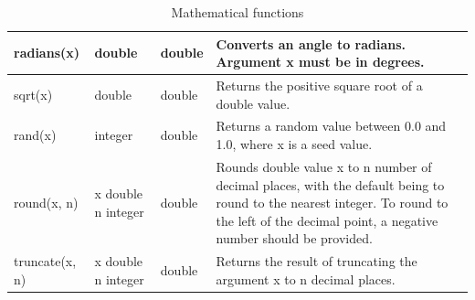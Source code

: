 \documentclass[11pt,a4paper]{ivoa}
\begin{document}
\begin{table}[thm]
\begin{tabular}{|p{}|p{}|p{}|p{}|}
        \hline
        radians(x) &
        double &
        double &
        Converts an angle to radians. Argument x must be in degrees.
        \tabularnewline

        \hline
        sqrt(x) &
        double &
        double &
        Returns the positive square root of a double value.
        \tabularnewline

        \hline
        rand(x) &
        integer &
        double &
        Returns a random value between 0.0 and 1.0, where x is a seed  value.
        \tabularnewline

        \hline
        round(x, n) &
        x double \newline n integer &
        double &
        Rounds double value x to n number of decimal places, with the default being to round to the nearest integer.
        To round to the left of the decimal point, a negative number should be provided.
        \tabularnewline

        \hline
        truncate(x, n) &
        x double \newline n integer &
        double &
        Returns the result of truncating the argument x to n decimal places.
        \tabularnewline

        \hline
    \end{tabular}
    \caption{Mathematical functions}
    \label{table:math.functions.table}
\end{table}
\end{document}
